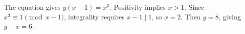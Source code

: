 The equation gives $y(x-1)=x^3$. Positivity implies $x>1$. Since $x^3\equiv1\pmod{x-1}$, integrality requires $x-1\mid1$, so $x=2$. Then $y=8$, giving $\boxed{y-x=6}$.
